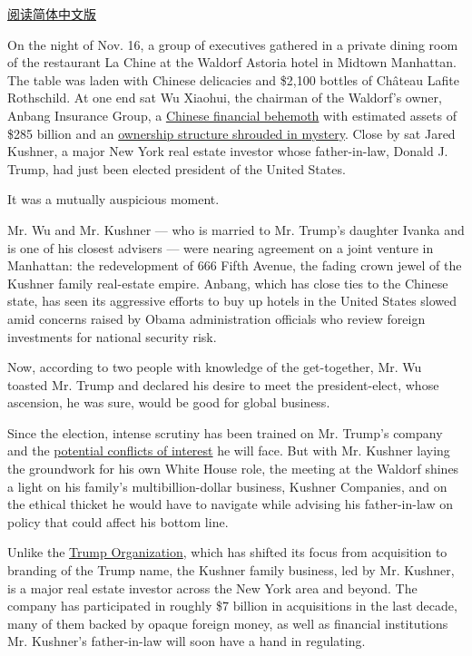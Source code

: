 \href{http://cn.nytimes.com/asia-pacific/20170108/jared-kushner-trump-business/}{阅读简体中文版}

On the night of Nov. 16, a group of executives gathered in a private
dining room of the restaurant La Chine at the Waldorf Astoria hotel in
Midtown Manhattan. The table was laden with Chinese delicacies and
\$2,100 bottles of Château Lafite Rothschild. At one end sat Wu Xiaohui,
the chairman of the Waldorf's owner, Anbang Insurance Group, a
\href{https://www.nytimes.com/2016/09/02/business/dealbook/anbang-global-shopping-spree-china-mystery-ownership.html?_r=0}{Chinese
financial behemoth} with estimated assets of \$285 billion and an
\href{https://www.nytimes.com/2016/09/02/world/asia/china-anbang-insurance.html}{ownership
structure shrouded in mystery}. Close by sat Jared Kushner, a major New
York real estate investor whose father-in-law, Donald J. Trump, had just
been elected president of the United States.

It was a mutually auspicious moment.

Mr. Wu and Mr. Kushner --- who is married to Mr. Trump's daughter Ivanka
and is one of his closest advisers --- were nearing agreement on a joint
venture in Manhattan: the redevelopment of 666 Fifth Avenue, the fading
crown jewel of the Kushner family real-estate empire. Anbang, which has
close ties to the Chinese state, has seen its aggressive efforts to buy
up hotels in the United States slowed amid concerns raised by Obama
administration officials who review foreign investments for national
security risk.

Now, according to two people with knowledge of the get-together, Mr. Wu
toasted Mr. Trump and declared his desire to meet the president-elect,
whose ascension, he was sure, would be good for global business.

Since the election, intense scrutiny has been trained on Mr. Trump's
company and the
\href{https://www.nytimes.com/2016/11/26/us/politics/donald-trump-international-business.html}{potential
conflicts of interest} he will face. But with Mr. Kushner laying the
groundwork for his own White House role, the meeting at the Waldorf
shines a light on his family's multibillion-dollar business, Kushner
Companies, and on the ethical thicket he would have to navigate while
advising his father-in-law on policy that could affect his bottom line.

Unlike the
\href{https://www.nytimes.com/2016/12/25/us/politics/trump-organization-business.html}{Trump
Organization}, which has shifted its focus from acquisition to branding
of the Trump name, the Kushner family business, led by Mr. Kushner, is a
major real estate investor across the New York area and beyond. The
company has participated in roughly \$7 billion in acquisitions in the
last decade, many of them backed by opaque foreign money, as well as
financial institutions Mr. Kushner's father-in-law will soon have a hand
in regulating.


